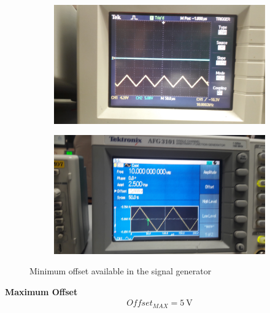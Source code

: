 \documentclass[letterpaper]{article}
\begin{document}
\begin{figure}[H]
    \begin{subfigure}{0.55\textwidth}
        \includegraphics[width=.95\linewidth]{img/part2/15}
    \end{subfigure}
    \begin{subfigure}{0.55\textwidth}
        \includegraphics[width=.95\linewidth]{img/part2/14}
    \end{subfigure}
    \caption{Minimum offset available in the signal generator}
\end{figure}
{\textbf{Maximum Offset}}
\begin{gather*}
    Offset_{MAX} = \SI{5}{\volt}
\end{gather*}
\end{document}
